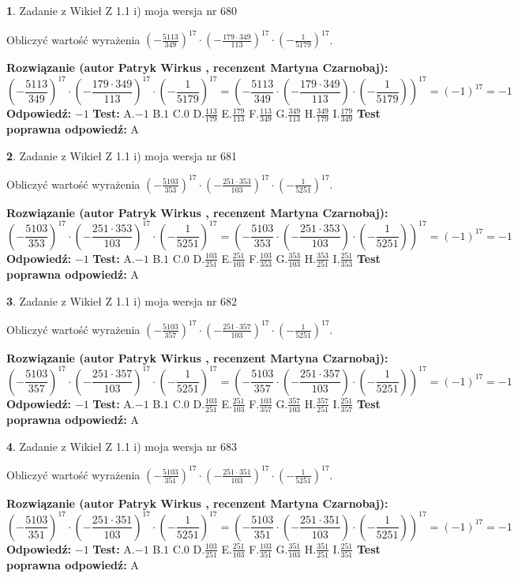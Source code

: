 \documentclass[12pt, a4paper]{article}
\theoremstyle{definition} %
\newtheorem{zad}{}
\newcommand{\zadStart}[1]{\begin{zad}#1\newline}
\newcommand{\zadStop}{\end{zad}}
\newcommand{\rozwStart}[2]{\noindent \textbf{Rozwiązanie (autor #1 , recenzent #2): }\newline}
\newcommand{\rozwStop}{\newline}
\newcommand{\odpStart}{\noindent \textbf{Odpowiedź:}\newline}
\newcommand{\odpStop}{\newline}
\newcommand{\testStart}{\noindent \textbf{Test:}\newline}
\newcommand{\testStop}{\newline}
\newcommand{\kluczStart}{\noindent \textbf{Test poprawna odpowiedź:}\newline}
\newcommand{\kluczStop}{\newline}
\begin{document}
\zadStart{Zadanie z Wikieł Z 1.1 i) moja wersja nr 680}

Obliczyć wartość wyrażenia $(-\frac{5113}{349})^{17} \cdot (-\frac{179 \cdot 349}{113})^{17} \cdot (-\frac{1}{5179})^{17}$.
\zadStop
\rozwStart{Patryk Wirkus}{Martyna Czarnobaj}
$$(-\frac{5113}{349})^{17} \cdot (-\frac{179 \cdot 349}{113})^{17} \cdot (-\frac{1}{5179})^{17} = (-\frac{5113}{349} \cdot (-\frac{179 \cdot 349}{113}) \cdot (-\frac{1}{5179}))^{17} = (-1)^{17} = -1$$
\rozwStop
\odpStart
$-1$
\odpStop
\testStart
A.$-1$ B.$1$ C.$0$ D.$\frac{113}{179}$ E.$\frac{179}{113}$
F.$\frac{113}{349}$ G.$\frac{349}{113}$
H.$\frac{349}{179}$
I.$\frac{179}{349}$
\testStop
\kluczStart
A
\kluczStop



\zadStart{Zadanie z Wikieł Z 1.1 i) moja wersja nr 681}

Obliczyć wartość wyrażenia $(-\frac{5103}{353})^{17} \cdot (-\frac{251 \cdot 353}{103})^{17} \cdot (-\frac{1}{5251})^{17}$.
\zadStop
\rozwStart{Patryk Wirkus}{Martyna Czarnobaj}
$$(-\frac{5103}{353})^{17} \cdot (-\frac{251 \cdot 353}{103})^{17} \cdot (-\frac{1}{5251})^{17} = (-\frac{5103}{353} \cdot (-\frac{251 \cdot 353}{103}) \cdot (-\frac{1}{5251}))^{17} = (-1)^{17} = -1$$
\rozwStop
\odpStart
$-1$
\odpStop
\testStart
A.$-1$ B.$1$ C.$0$ D.$\frac{103}{251}$ E.$\frac{251}{103}$
F.$\frac{103}{353}$ G.$\frac{353}{103}$
H.$\frac{353}{251}$
I.$\frac{251}{353}$
\testStop
\kluczStart
A
\kluczStop



\zadStart{Zadanie z Wikieł Z 1.1 i) moja wersja nr 682}

Obliczyć wartość wyrażenia $(-\frac{5103}{357})^{17} \cdot (-\frac{251 \cdot 357}{103})^{17} \cdot (-\frac{1}{5251})^{17}$.
\zadStop
\rozwStart{Patryk Wirkus}{Martyna Czarnobaj}
$$(-\frac{5103}{357})^{17} \cdot (-\frac{251 \cdot 357}{103})^{17} \cdot (-\frac{1}{5251})^{17} = (-\frac{5103}{357} \cdot (-\frac{251 \cdot 357}{103}) \cdot (-\frac{1}{5251}))^{17} = (-1)^{17} = -1$$
\rozwStop
\odpStart
$-1$
\odpStop
\testStart
A.$-1$ B.$1$ C.$0$ D.$\frac{103}{251}$ E.$\frac{251}{103}$
F.$\frac{103}{357}$ G.$\frac{357}{103}$
H.$\frac{357}{251}$
I.$\frac{251}{357}$
\testStop
\kluczStart
A
\kluczStop



\zadStart{Zadanie z Wikieł Z 1.1 i) moja wersja nr 683}

Obliczyć wartość wyrażenia $(-\frac{5103}{351})^{17} \cdot (-\frac{251 \cdot 351}{103})^{17} \cdot (-\frac{1}{5251})^{17}$.
\zadStop
\rozwStart{Patryk Wirkus}{Martyna Czarnobaj}
$$(-\frac{5103}{351})^{17} \cdot (-\frac{251 \cdot 351}{103})^{17} \cdot (-\frac{1}{5251})^{17} = (-\frac{5103}{351} \cdot (-\frac{251 \cdot 351}{103}) \cdot (-\frac{1}{5251}))^{17} = (-1)^{17} = -1$$
\rozwStop
\odpStart
$-1$
\odpStop
\testStart
A.$-1$ B.$1$ C.$0$ D.$\frac{103}{251}$ E.$\frac{251}{103}$
F.$\frac{103}{351}$ G.$\frac{351}{103}$
H.$\frac{351}{251}$
I.$\frac{251}{351}$
\testStop
\kluczStart
A
\kluczStop
\end{document}
